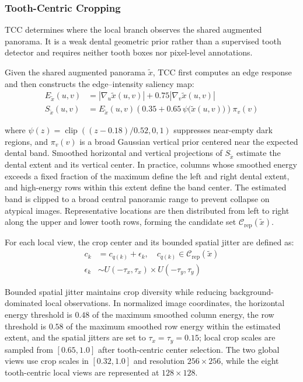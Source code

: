 \documentclass[conference]{IEEEtran}
\newcommand{\TCC}{\textsc{TCC}}
\begin{document}
\subsubsection{Tooth-Centric Cropping}

\TCC{} determines where the local branch observes the shared augmented panorama. It is a weak dental geometric prior rather than a supervised tooth detector and requires neither tooth boxes nor pixel-level annotations.

Given the shared augmented panorama $\tilde{x}$, \TCC{} first computes
an edge response and then constructs the edge--intensity saliency map:
\begin{align}
E_{\tilde{x}}(u,v)
&=
\left|\nabla_u\tilde{x}(u,v)\right|
+
0.75\left|\nabla_v\tilde{x}(u,v)\right|
\label{eq:tcc-edge-response}
\\
S_{\tilde{x}}(u,v)
&=
E_{\tilde{x}}(u,v)
\left(
0.35
+
0.65\,\psi\bigl(\tilde{x}(u,v)\bigr)
\right)
\pi_v(v)
\label{eq:tcc-saliency}
\end{align}

where $\psi(z)=\operatorname{clip}((z-0.18)/0.52,0,1)$ suppresses near-empty dark regions, and $\pi_v(v)$ is a broad Gaussian vertical prior centered near the expected dental band. Smoothed horizontal and vertical projections of $S_{\tilde{x}}$ estimate the dental extent and its vertical center. In practice, columns whose smoothed energy exceeds a fixed fraction of the maximum define the left and right dental extent, and high-energy rows within this extent define the band center. The estimated band is clipped to a broad central panoramic range to prevent collapse on atypical images. Representative locations are then distributed from left to right along the upper and lower tooth rows, forming the candidate set $\mathcal{C}_{\mathrm{rep}}(\tilde{x})$.

For each local view, the crop center and its bounded spatial jitter are
defined as:
\begin{align}
c_k
&=
c_{q(k)}+\epsilon_k,
\quad
c_{q(k)}\in\mathcal{C}_{\mathrm{rep}}(\tilde{x})
\label{eq:tcc-centers}
\\
\epsilon_k
&\sim
U(-\tau_x,\tau_x)
\times
U(-\tau_y,\tau_y)
\label{eq:tcc-center-jitter}
\end{align}

Bounded spatial jitter maintains crop diversity while reducing background-dominated local observations. In normalized image coordinates, the horizontal energy threshold is $0.48$ of the maximum smoothed column energy, the row threshold is $0.58$ of the maximum smoothed row energy within the estimated extent, and the spatial jitters are set to $\tau_x=\tau_y=0.15$; local crop scales are sampled from $[0.65,1.0]$ after tooth-centric center selection. The two global views use crop scales in $[0.32,1.0]$ and resolution $256\times256$, while the eight tooth-centric local views are represented at $128\times128$.
\end{document}
